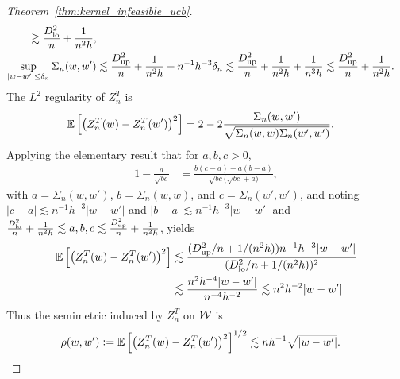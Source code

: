 \begin{proof}[Theorem~\ref{thm:kernel_infeasible_ucb}]
\begin{align*}
    \gtrsim
    \frac{D_{\textup{lo}}^2}{n}
    + \frac{1}{n^2h}, \\
    \sup_{|w-w'| \leq \delta_n}
    \Sigma_n(w,w')
    &\lesssim
    \frac{D_{\textup{up}}^2}{n}
    + \frac{1}{n^2h}
    + n^{-1} h^{-3} \delta_n
    \lesssim
    \frac{D_{\textup{up}}^2}{n}
    + \frac{1}{n^2h}
    + \frac{1}{n^3h}
    \lesssim
    \frac{D_{\textup{up}}^2}{n}
    + \frac{1}{n^2h}.
  \end{align*}
  The $L^2$
  regularity of $Z_n^T$
  is
  \begin{align*}
    \mathbb{E}\left[
      \big(
        Z_n^T(w) - Z_n^T(w')
      \big)^2
    \right]
    &=
    2 - 2
    \frac{\Sigma_n(w,w')}
    {\sqrt{\Sigma_n(w,w) \Sigma_n(w',w')}}.
  \end{align*}
  Applying the elementary result
  that for $a,b,c > 0$,
  \begin{align*}
    1 - \frac{a}{\sqrt{b c}}
    &=
    \frac{b(c-a) + a(b-a)}
    {\sqrt{b c}\big(\sqrt{b c} + a\big)},
  \end{align*}
  with $a = \Sigma_n(w,w')$,
  $b = \Sigma_n(w,w)$,
  and $c = \Sigma_n(w',w')$,
  and noting $|c-a| \lesssim n^{-1} h^{-3} |w-w'|$
  and $|b-a| \lesssim n^{-1} h^{-3} |w-w'|$ and
  $\frac{D_{\textup{lo}}^2}{n} + \frac{1}{n^2h}
  \lesssim a,b,c \lesssim \frac{D_{\textup{up}}^2}{n} + \frac{1}{n^2h}$,
  yields
  \begin{align*}
    \mathbb{E}\left[
      \big(
        Z_n^T(w) - Z_n^T(w')
      \big)^2
    \right]
    &\lesssim
    \frac{(D_{\textup{up}}^2/n + 1/(n^2h))n^{-1}h^{-3}|w-w'|}
    {(D_{\textup{lo}}^2/n + 1/(n^2h))^2} \\
    &\lesssim
    \frac{n^{2} h^{-4}|w-w'|}
    {n^{-4}h^{-2}}
    \lesssim
    n^2 h^{-2} |w-w'|.
  \end{align*}
  Thus the semimetric
  induced by $Z_n^T$ on $\mathcal{W}$ is
  \begin{align*}
    \rho(w,w')
    &\vcentcolon=
    \mathbb{E}\left[
      \big(
        Z_n^T(w) - Z_n^T(w')
      \big)^2
    \right]^{1/2}
    \lesssim
    n h^{-1} \sqrt{|w-w'|}.
  \end{align*}



\end{proof}
